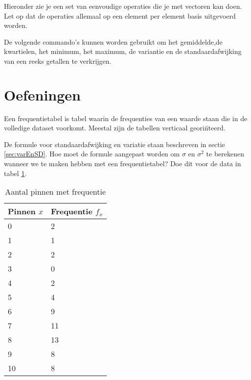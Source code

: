 Hieronder zie je een set van eenvoudige operaties die je met vectoren kan doen. Let op dat de operaties allemaal op een element per element basis uitgevoerd worden. 


De volgende commando's kunnen worden gebruikt om het gemiddelde,de kwartielen, het  minimum, het maximum, de variantie en  de standaardafwijking van een reeks getallen te verkrijgen.




\section{Oefeningen}

\begin{definition}
	Een frequentietabel is tabel waarin de frequenties van een waarde staan die in de volledige dataset voorkomt. Meestal zijn de tabellen verticaal geori\"nteerd.
\end{definition}

\begin{exercise}
		De formule voor standaardafwijking en variatie staan beschreven in sectie \ref{sec:varEnSD}. 
		Hoe moet de formule aangepast worden om $\sigma$ en $\sigma^{2}$ te berekenen wanneer we te
		maken hebben met een frequentietabel? Doe dit voor de data in tabel \ref{tab:pinfreq}.
\end{exercise}

	\begin{table}[b]
		\centering
		\caption{Aantal pinnen met frequentie}
		\label{tab:pinfreq}
		\begin{tabular}{@{}ll@{}}
			\toprule
			Pinnen $x$ & Frequentie $f_{x}$ \\ \midrule
			0          & 2                  \\
			1          & 1                  \\
			2          & 2                  \\
			3          & 0                  \\
			4          & 2                  \\
			5          & 4                  \\
			6          & 9                  \\
			7          & 11                 \\
			8          & 13                 \\
			9          & 8                  \\ \midrule
			10         & 8                  \\ \bottomrule
		\end{tabular}
	\end{table}
	
